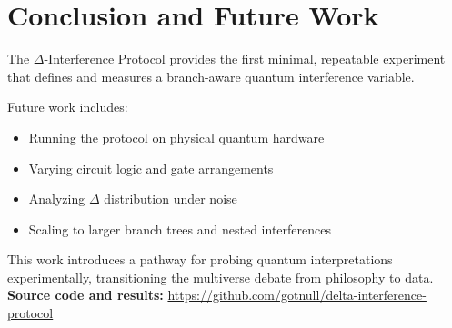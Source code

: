 \documentclass[12pt]{article}
\begin{document}
\section{Conclusion and Future Work}
The $\Delta$-Interference Protocol provides the first minimal, repeatable experiment that defines and measures a branch-aware quantum interference variable.

Future work includes:
\begin{itemize}
\item Running the protocol on physical quantum hardware
\item Varying circuit logic and gate arrangements
\item Analyzing $\Delta$ distribution under noise
\item Scaling to larger branch trees and nested interferences
\end{itemize}

This work introduces a pathway for probing quantum interpretations experimentally, transitioning the multiverse debate from philosophy to data.\\[2mm]
\textbf{Source code and results:} \href{https://github.com/gotnull/delta-interference-protocol}{https://github.com/gotnull/delta-interference-protocol}
\end{document}
